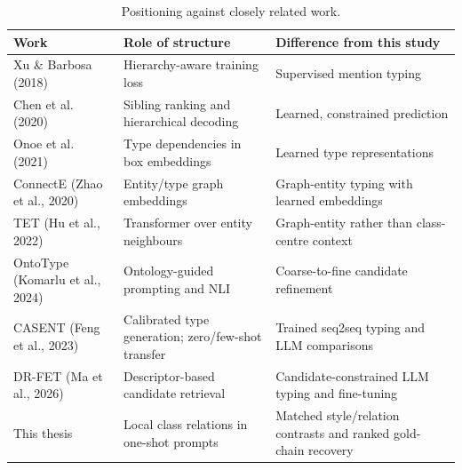 \begingroup
\begin{table}[!htbp]
\setlength{\tabcolsep}{3pt}
\renewcommand{\arraystretch}{1.18}
\fontsize{8.5}{10.5}\selectfont
\renewcommand{\thetable}{3.1}
\caption{Positioning against closely related work.}\label{table:3.1}
\begin{tabular}{>{\raggedright\arraybackslash}p{}>{\raggedright\arraybackslash}p{}>{\raggedright\arraybackslash}p{}}
\toprule
\textbf{Work} & \textbf{Role of structure} & \textbf{Difference from this study} \\
\midrule
Xu \& Barbosa (2018) & Hierarchy-aware training loss & Supervised mention typing \\
Chen et al. (2020) & Sibling ranking and hierarchical decoding & Learned, constrained prediction \\
Onoe et al. (2021) & Type dependencies in box embeddings & Learned type representations \\
ConnectE (Zhao et al., 2020) & Entity/type graph embeddings & Graph-entity typing with learned embeddings \\
TET (Hu et al., 2022) & Transformer over entity neighbours & Graph-entity rather than class-centre context \\
OntoType (Komarlu et al., 2024) & Ontology-guided prompting and NLI & Coarse-to-fine candidate refinement \\
CASENT (Feng et al., 2023) & Calibrated type generation; zero/few-shot transfer & Trained seq2seq typing and LLM comparisons \\
DR-FET (Ma et al., 2026) & Descriptor-based candidate retrieval & Candidate-constrained LLM typing and fine-tuning \\
This thesis & Local class relations in one-shot prompts & Matched style/relation contrasts and ranked gold-chain recovery \\
\bottomrule
\end{tabular}
\end{table}
\endgroup

